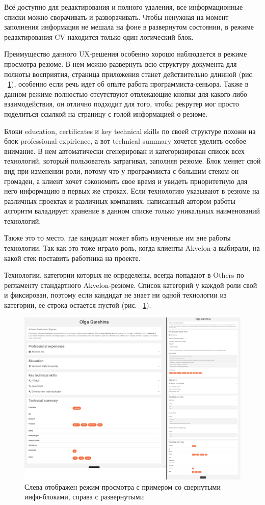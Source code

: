 \documentclass[14pt, a4paper]{diplom}
\begin{document}
Всё доступно для редактирования и полного удаления, все информационные списки можно сворачивать и разворачивать. Чтобы ненужная на момент заполнения информация не мешала на фоне в развернутом состоянии, в режиме редактирования CV находится
только один логический блок.

Преимущество данного UX-решения особенно хорошо наблюдается в режиме просмотра резюме. В нем можно развернуть всю структуру документа для полноты восприятия, страница приложения станет действительно длинной (рис. ~\ref{13}), особенно если речь идет об опыте работа программиста-сеньора.
Также в данном режиме полностью отсутствуют отвлекающие кнопки для какого-либо взаимодействия, он отлично подходит для того, чтобы рекрутер мог просто поделиться ссылкой на страницу с голой информацией о резюме.

Блоки education, certificates и key technical skills по своей структуре похожи на блок professional expirience, а вот technical summary хочется уделить особое внимание.
В нем автоматически сгенерирован и категоризирован список всех технологий, который пользователь затрагивал, заполняя резюме. Блок меняет свой вид при изменении роли, потому что у программиста с большим стеком он
громаден, а клиент хочет сэкономить свое время и увидеть приоритетную для него информацию в первых же строках. Если технологию указывают в резюме на различных проектах и различных компаниях, написанный автором работы алгоритм валадирует хранение в данном списке только уникальных наименований технологий.

Также это то место, где кандидат может вбить изученные им вне работы технологии. Так как это тоже играло роль, когда клиенты Akvelon-а выбирали, на какой стек поставить работника на проекте.

Технологии, категории которых не определены, всегда попадают в Others по регламенту стандартного Akvelon-резюме. Список категорий у каждой роли свой и фиксирован, поэтому если кандидат не знает ни одной технологии из категории, ее строка остается пустой (рис. ~\ref{13}).
\begin{figure}[!ht]
\centering
\includegraphics[width=1\textwidth]{resources/expand.png}
\caption{Слева отображен режим просмотра с примером со свернутыми инфо-блоками, справа с развернутыми}
\label{13}
\end{figure}
\end{document}
